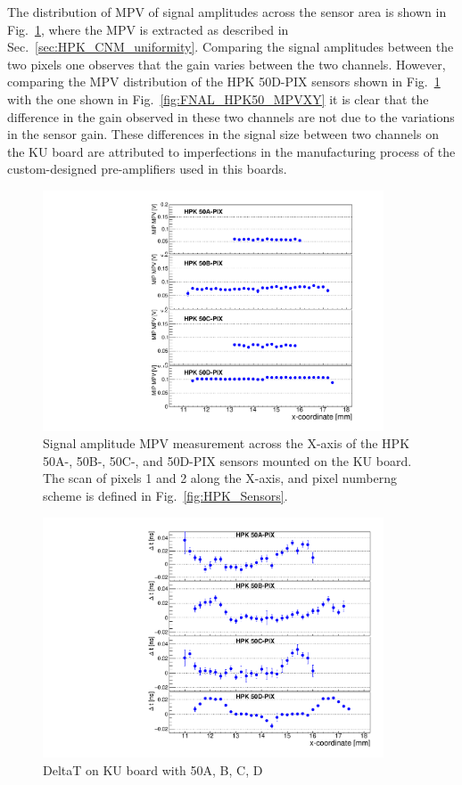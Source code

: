 \documentclass[preprint,1p]{elsarticle}
\begin{document}
The distribution of MPV of signal amplitudes across the sensor area is shown in
Fig.~\ref{fig:KUBoard_50ABCD_MPV}, where the MPV is extracted as described in
Sec.~\ref{sec:HPK_CNM_uniformity}. Comparing the signal amplitudes between the
two pixels one observes that the gain varies between the two channels. However,
comparing the MPV distribution of the HPK 50D-PIX sensors shown in
Fig.~\ref{fig:KUBoard_50ABCD_MPV} with the one shown in
Fig.~\ref{fig:FNAL_HPK50_MPVXY} it is clear that the difference in the gain
observed in these two channels are not due to the variations in the sensor gain.
These differences in the signal size between two channels on the KU board are
attributed to imperfections in the manufacturing process of the custom-designed
pre-amplifiers used in this boards.

\begin{figure}[htbp] 
\centering
\includegraphics[width=0.9\textwidth]{figs/KUBoard_HPK50ABCD/KUBoard_50ABCD_MPV.pdf} 
\caption{Signal amplitude MPV measurement across the X-axis of the HPK 50A-, 50B-, 50C-, and 50D-PIX sensors mounted on the KU board. The scan of pixels 1 and 2 along the X-axis, and pixel numberng scheme is defined in Fig.~\ref{fig:HPK_Sensors}.} 
\label{fig:KUBoard_50ABCD_MPV} 
\end{figure} 

\begin{figure}[htbp] 
\centering
\includegraphics[width=0.9\textwidth]{figs/KUBoard_HPK50ABCD/KUBoard_50ABCD_MeanTime.pdf} 
\caption{DeltaT on KU board with 50A, B, C, D } 
\label{fig:Sensors} 
\end{figure} 
\end{document}

